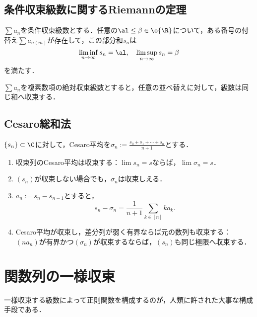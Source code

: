 \documentclass[uplatex, dvipdfmx]{jsreport}
\begin{document}
\subsection{条件収束級数に関するRiemannの定理}

\begin{theorem}[Riemann]
    $\sum a_n$を条件収束級数とする．任意の$\al\le\beta\in\o{\R}$について，ある番号の付替え$\sum a_{n(m)}$が存在して，この部分和$s_n$は
    \[\liminf_{n\to\infty}s_n=\al,\quad\limsup_{n\to\infty}s_n=\beta\]
    を満たす．
\end{theorem}

\begin{theorem}
    $\sum a_n$を複素数項の絶対収束級数とすると，任意の並べ替えに対して，級数は同じ和へ収束する．
\end{theorem}

\subsection{Cesaro総和法}

\begin{notation}
    $\{s_n\}\subset\C$に対して，Cesaro平均を$\sigma_n:=\frac{s_0+s_1+\cdots+s_n}{n+1}$とする．
\end{notation}

\begin{proposition}[収束は同値]\mbox{}
    \begin{enumerate}
        \item 収束列のCesaro平均は収束する：$\lim s_n=s$ならば，$\lim\sigma_n=s$．
        \item $(s_n)$が収束しない場合でも，$\sigma_n$は収束しえる．
        \item $a_n:=s_n-s_{n-1}$とすると，
        \[s_n-\sigma_n=\frac{1}{n+1}\sum_{k\in[n]}ka_k.\]
        \item Cesaro平均が収束し，差分列が弱く有界ならば元の数列も収束する：$(na_n)$が有界かつ$(\sigma_n)$が収束するならば，$(s_n)$も同じ極限へ収束する．
    \end{enumerate}
\end{proposition}

\section{関数列の一様収束}

\begin{tcolorbox}[colframe=ForestGreen, colback=ForestGreen!10!white,breakable,colbacktitle=ForestGreen!40!white,coltitle=black,fonttitle=\bfseries\sffamily,
title=]
    一様収束する級数によって正則関数を構成するのが，人類に許された大事な構成手段である．
\end{tcolorbox}
\end{document}
